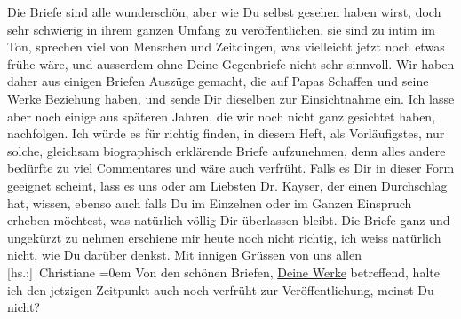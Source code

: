 \begin{ledgroupsized}[t]{13cm}
           \pstart
           Die Briefe sind alle wunderschön, aber wie Du selbst gesehen haben wirst, doch
                    sehr schwierig in ihrem ganzen Umfang zu veröffentlichen, sie sind zu intim im
                    Ton, sprechen viel von Menschen und Zeitdingen, was vielleicht jetzt noch etwas
                    frühe wäre, und ausserdem ohne Deine Gegenbriefe nicht sehr sinnvoll.\pend
           \pstart
           Wir haben daher aus einigen Briefen Auszüge gemacht, die auf Papas Schaffen und seine Werke Beziehung
                    haben, und sende Dir dieselben zur Einsichtnahme ein. Ich lasse aber noch einige
                    aus späteren Jahren, die wir noch nicht ganz gesichtet haben, nachfolgen. Ich
                    würde es für richtig finden, in diesem Heft, als Vorläufigstes, nur solche,
                    gleichsam biographisch erklärende Briefe aufzunehmen, denn alles andere bedürfte
                    zu viel Commentares und wäre auch verfrüht.\pend
           \pstart
           Falls es Dir in dieser Form geeignet scheint, lass es uns oder am Liebsten Dr.
                        Kayser, der einen Durchschlag hat,
                    wissen, ebenso auch falls Du im Einzelnen oder im Ganzen Einspruch erheben
                    möchtest, was natürlich völlig Dir überlassen bleibt. Die Briefe ganz und
                    ungekürzt zu nehmen erschiene mir heute noch nicht richtig, ich weiss natürlich
                    nicht, wie Du darüber denkst.\pend
           \pstart
           Mit innigen Grüssen von uns allen{\\[\baselineskip]}\spacefill\mbox{{[}hs.:{]} Christiane}\pend
           \leftskip=0em{}\pstart
           \noindent{}{\pb}Von den schönen Briefen, \uline{Deine Werke} betreffend, halte ich den
                        jetzigen Zeitpunkt auch noch verfrüht zur Veröffentlichung, meinst Du
                        nicht?\pend
           
         
         \endnumbering{}\end{ledgroupsized}  \newcommand{\dateiname}{L02522}\newcommand{\titel}{Christiane von Hofmannsthal an Arthur Schnitzler, 3. 9. 1929}\newcommand{\editorInnen}{Martin Anton Müller und Gerd-Hermann Susen}
      